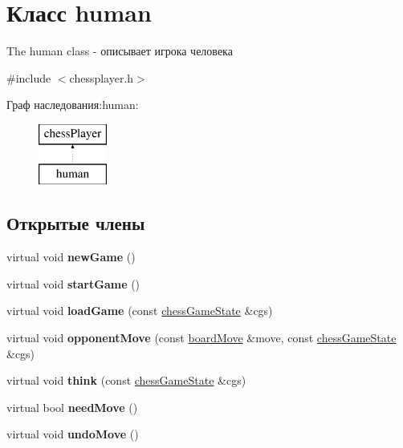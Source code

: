 \hypertarget{classhuman}{}\section{Класс human}
\label{classhuman}


The human class -\/ описывает игрока человека  




{\ttfamily \#include $<$chessplayer.\+h$>$}

Граф наследования\+:human\+:\begin{figure}[H]
\begin{center}
\leavevmode
\includegraphics[height=2.000000cm]{classhuman}
\end{center}
\end{figure}
\subsection*{Открытые члены}
\begin{DoxyCompactItemize}
\item 
\hypertarget{classhuman_ab6ea3978f6ae2063a1d360d6e20a0b47}{}virtual void {\bfseries new\+Game} ()\label{classhuman_ab6ea3978f6ae2063a1d360d6e20a0b47}

\item 
\hypertarget{classhuman_abc8745ed5e64b8b310f0c76d2cbec5ae}{}virtual void {\bfseries start\+Game} ()\label{classhuman_abc8745ed5e64b8b310f0c76d2cbec5ae}

\item 
\hypertarget{classhuman_a1eb4181308ddcc845d1b343df3198571}{}virtual void {\bfseries load\+Game} (const \hyperlink{classchess_game_state}{chess\+Game\+State} \&cgs)\label{classhuman_a1eb4181308ddcc845d1b343df3198571}

\item 
\hypertarget{classhuman_a4f7c6fe7a7587988770a2bbdd958bdd8}{}virtual void {\bfseries opponent\+Move} (const \hyperlink{classboard_move}{board\+Move} \&move, const \hyperlink{classchess_game_state}{chess\+Game\+State} \&cgs)\label{classhuman_a4f7c6fe7a7587988770a2bbdd958bdd8}

\item 
\hypertarget{classhuman_ac6d7203ea1aed0d6d6f975fd6f742587}{}virtual void {\bfseries think} (const \hyperlink{classchess_game_state}{chess\+Game\+State} \&cgs)\label{classhuman_ac6d7203ea1aed0d6d6f975fd6f742587}

\item 
\hypertarget{classhuman_a9f4bf903965712cbf4eef040296a362c}{}virtual bool {\bfseries need\+Move} ()\label{classhuman_a9f4bf903965712cbf4eef040296a362c}

\item 
\hypertarget{classhuman_a7d61da059e3b85229206c9a16222e648}{}virtual void {\bfseries undo\+Move} ()\label{classhuman_a7d61da059e3b85229206c9a16222e648}

\end{DoxyCompactItemize}


